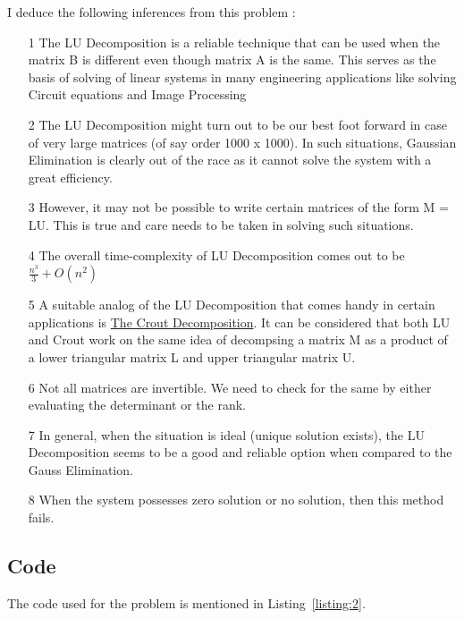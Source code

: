 \documentclass[titlepage, 11pt]{article}
\begin{document}
I deduce the following inferences from this problem :
\begin{itemize}
    \item [1] The LU Decomposition is a reliable technique that can be used when the matrix B is different even though matrix A is the same. This serves as the basis of solving of linear systems in many engineering applications like solving Circuit equations and Image Processing
    \item [2] The LU Decomposition might turn out to be our best foot forward in case of very large matrices (of say order 1000 x 1000). In such situations, Gaussian Elimination is clearly out of the race as it cannot solve the system with a great efficiency. 
    \item [3] However, it may not be possible to write certain matrices of the form M = LU. This is true and care needs to be taken in solving such situations. 
    \item [4] The overall time-complexity of LU Decomposition comes out to be $\frac{n^3}{3} + O(n^2)$
    \item [5] A suitable analog of the LU Decomposition that comes handy in certain applications is \href{https://en.wikipedia.org/wiki/Crout_matrix_decomposition}{The Crout Decomposition}. It can be considered that both LU and Crout work on the same idea of decompsing a matrix M as a product of a lower triangular matrix L and upper triangular matrix U.
    \item [6] Not all matrices are invertible. We need to check for the same by either evaluating the determinant or the rank. 
    \item [7] In general, when the situation is ideal (unique solution exists), the LU Decomposition seems to be a good and reliable option when compared to the Gauss Elimination. 
    \item [8] When the system possesses zero solution or no solution, then this method fails. 
\end{itemize}


\subsection{Code}
The code used for the problem is mentioned in Listing~\ref{listing:2}. 

\inputminted[breaklines,
 mathescape,
 linenos,
 numbersep=5pt,
 frame=single,
 numbersep=5pt,
 xleftmargin=0pt]{c}{A4P2.c}
\label{listing:2}
\end{document}
